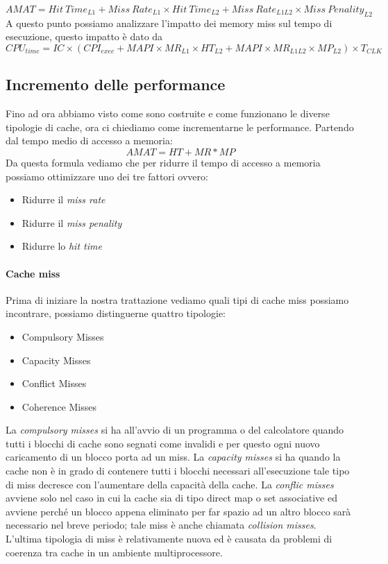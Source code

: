 $$AMAT = Hit \ Time_{L1} + Miss \ Rate_{L1} \times Hit \ Time_{L2} + Miss \ Rate_{L1L2} \times Miss \ Penality_{L2}$$
A questo punto possiamo analizzare l'impatto dei memory miss sul tempo di esecuzione, questo impatto è dato da 
$$CPU_{time} = IC \times (CPI_{exec} + MAPI \times MR_{L1} \times HT_{L2}+ MAPI \times MR_{L1L2} \times MP_{L2}) \times T_{CLK}$$
\subsection{Incremento delle performance}
Fino ad ora abbiamo visto come sono costruite e come funzionano le diverse tipologie di cache, ora ci chiediamo come incrementarne le performance. Partendo dal tempo medio di accesso a memoria:
$$AMAT = HT + MR * MP$$
Da questa formula vediamo che per ridurre il tempo di accesso a memoria possiamo ottimizzare uno dei tre fattori ovvero:
\begin{itemize}
\item Ridurre il \emph{miss rate}
\item Ridurre il \emph{miss penality}
\item Ridurre lo \emph{hit time}
\end{itemize}
\paragraph{Cache miss}
Prima di iniziare la nostra trattazione vediamo quali tipi di cache miss possiamo incontrare, possiamo distinguerne quattro tipologie:
\begin{itemize}
\item Compulsory Misses
\item Capacity Misses
\item Conflict Misses
\item Coherence Misses
\end{itemize}
La \emph{compulsory misses} si ha all'avvio di un programma o del calcolatore quando tutti i blocchi di cache sono segnati come invalidi e per questo ogni nuovo caricamento di un blocco porta ad un miss.
La \emph{capacity misses} si ha quando la cache non è in grado di contenere tutti i blocchi necessari all'esecuzione tale tipo di miss decresce con l'aumentare della capacità della cache.
La \emph{conflic misses} avviene solo nel caso in cui la cache sia di tipo direct map o set associative ed avviene perché un blocco appena eliminato per far spazio ad un altro blocco sarà necessario nel breve periodo; tale miss è anche chiamata \emph{collision misses}.
L'ultima tipologia di miss è relativamente nuova ed è causata da problemi di coerenza tra cache in un ambiente multiprocessore.
